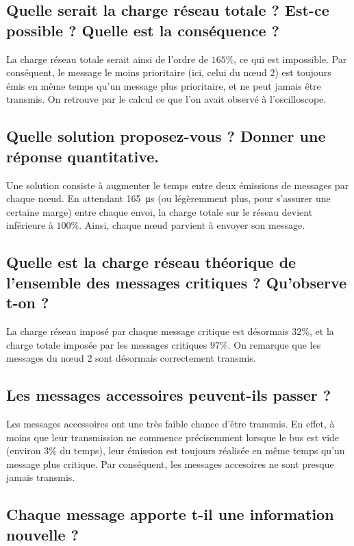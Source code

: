 \documentclass[12pt]{article}
\begin{document}
\subsection{Quelle serait la charge réseau totale ? Est-ce possible ? Quelle est la conséquence ?}

La charge réseau totale serait ainsi de l'ordre de $165\%$, ce qui est impossible. Par conséquent, le message le moins prioritaire (ici, celui du nœud 2) est toujours émis en même temps qu'un message plus prioritaire, et ne peut jamais être transmis. On retrouve par le calcul ce que l'on avait observé à l'oscilloscope.

\subsection{Quelle solution proposez-vous ? Donner une réponse quantitative.} 

Une solution consiste à augmenter le temps entre deux émissions de messages par chaque nœud. En attendant \SI{165}{\micro\second} (ou légèremment plus, pour s'assurer une certaine marge) entre chaque envoi, la charge totale sur le réseau devient inférieure à $100\%$. Ainsi, chaque nœud parvient à envoyer son message.

\subsection{Quelle est la charge réseau théorique de l'ensemble des messages critiques ? Qu'observe t-on ?}

La charge réseau imposé par chaque message critique est désormais $32\%$, et la charge totale imposée par les messages critiques $97\%$. On remarque que les messages du nœud 2 sont désormais correctement transmis.

\subsection{Les messages accessoires peuvent-ils passer ?}

Les messages accessoires ont une très faible chance d'être transmis. En effet, à moins que leur transmission ne commence précisemment lorsque le bus est vide (environ $3\%$ du temps), leur émission est toujours réalisée en même temps qu'un message plus critique. Par conséquent, les messages accesoires ne sont presque jamais transmis.

\subsection{Chaque message apporte t-il une information nouvelle ?}
\end{document}
